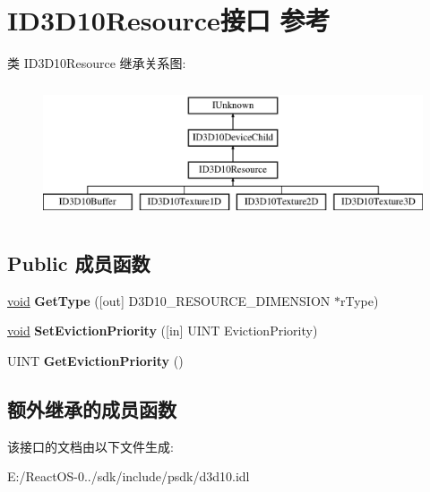 \hypertarget{interface_i_d3_d10_resource}{}\section{I\+D3\+D10\+Resource接口 参考}
\label{interface_i_d3_d10_resource}
类 I\+D3\+D10\+Resource 继承关系图\+:\begin{figure}[H]
\begin{center}
\leavevmode
\includegraphics[height=4.000000cm]{interface_i_d3_d10_resource}
\end{center}
\end{figure}
\subsection*{Public 成员函数}
\begin{DoxyCompactItemize}
\item 
\mbox{\label{interface_i_d3_d10_resource_a99cf78530ec138051daf09d32a880614}} 
\hyperlink{interfacevoid}{void} {\bfseries Get\+Type} (\mbox{[}out\mbox{]} D3\+D10\+\_\+\+R\+E\+S\+O\+U\+R\+C\+E\+\_\+\+D\+I\+M\+E\+N\+S\+I\+ON $\ast$r\+Type)
\item 
\mbox{\label{interface_i_d3_d10_resource_ac839f589a606a0ec0019c1a8672a47d0}} 
\hyperlink{interfacevoid}{void} {\bfseries Set\+Eviction\+Priority} (\mbox{[}in\mbox{]} U\+I\+NT Eviction\+Priority)
\item 
\mbox{\label{interface_i_d3_d10_resource_a4882dff6448d678784248f887cfa91c0}} 
U\+I\+NT {\bfseries Get\+Eviction\+Priority} ()
\end{DoxyCompactItemize}
\subsection*{额外继承的成员函数}


该接口的文档由以下文件生成\+:\begin{DoxyCompactItemize}
\item 
E\+:/\+React\+O\+S-\/0../sdk/include/psdk/d3d10.\+idl\end{DoxyCompactItemize}
